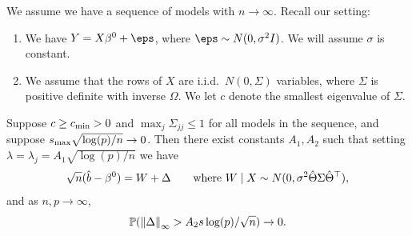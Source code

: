 We assume we have a sequence of models with $n \to \infty$. Recall our setting:
\begin{enumerate}
	\item We have $Y = X\beta^0 + \eps$, where $\eps \sim N(0, \sigma^2I)$. We will assume $\sigma$ is constant. 
	\item We assume that the rows of $X$ are i.i.d.\ $N(0, \Sigma)$ variables, where $\Sigma$ is positive definite with inverse $\Omega$. We let $c$ denote the smallest eigenvalue of $\Sigma$. 
\end{enumerate}
\begin{theorem}
	Suppose $c \geq c_\mathrm{min} > 0$ and $\max_j \Sigma_{jj} \leq 1$ for all models in the sequence, and suppose $s_\mathrm{max} \sqrt{\log(p) / n} \to 0$. Then there exist constants $A_1, A_2$ such that setting $\lambda = \lambda_j = A_1 \sqrt{\log(p)/n}$ we have
\begin{align*}
	\sqrt n(\hat b - \beta^0) = W + \Delta \qquad\text{where } W \mid X  \sim N(0, \sigma^2 \hat\Theta\Sigma\hat\Theta^\top), 
\end{align*}
and as $n, p \to\infty$, 
\[
\mathbb P(\norm{\Delta}_\infty > A_2 s \log(p)/\sqrt n) \to 0. 
\]
\end{theorem}

